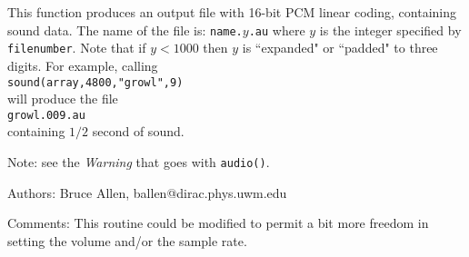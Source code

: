 This function produces an output file with 16-bit PCM linear coding,
containing sound data.  The name of the file is:
{\tt name.$y$.au} where $y$ is the integer specified by {\tt filenumber}.
Note that if $y<1000$ then $y$ is ``expanded" or ``padded" to three
digits.  For example, calling\\
{\tt sound(array,4800,"growl",9)}\\
will produce the file\\
{\tt growl.009.au}\\
containing $1/2$ second of sound.

Note: see the {\it Warning} that goes with {\tt audio()}.
\begin{description}
\item{Authors:}
Bruce Allen, ballen@dirac.phys.uwm.edu
\item{Comments:}
This routine could be modified to permit a bit more freedom in
setting the volume and/or the sample rate.
\end{description}
\clearpage

